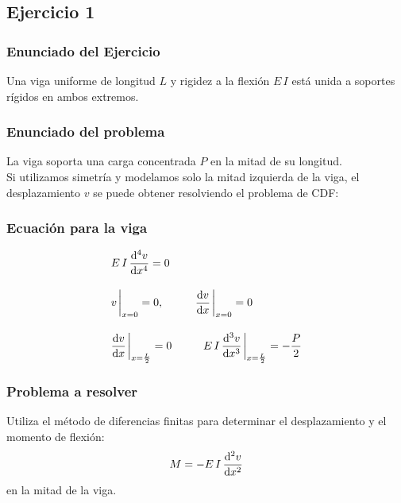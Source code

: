 \documentclass[12pt]{beamer}
\begin{document}
\subsection{Ejercicio 1}

\begin{frame}
\frametitle{Enunciado del Ejercicio}
Una viga uniforme de longitud $L$ y rigidez a la flexión $E \, I$ está unida a soportes rígidos en ambos extremos.
\\
\bigskip
\pause
\begin{figure}
\end{figure}
\end{frame}
\begin{frame}
\frametitle{Enunciado del problema}
La viga soporta una carga concentrada $P$ en la mitad de su longitud.
\\
\bigskip
\pause
Si utilizamos simetría y modelamos solo la mitad izquierda de la viga, el desplazamiento $v$ se puede obtener resolviendo el problema de CDF:
\end{frame}
\begin{frame}
\frametitle{Ecuación para la viga}
\begin{align*}
&E \, I \, \dv[4]{v}{x} = 0 \\[1em]
&v \eval_{x=0} = 0, \hspace{1cm} \dv{v}{x} \eval_{x=0} = 0 \\[1em]
&\dv{v}{x} \eval_{x=\frac{L}{2}} = 0 \hspace{1cm} E \, I \, \dv[3]{v}{x} \eval_{x=\frac{L}{2}} = -\dfrac{P}{2}
\end{align*}
\end{frame}
\begin{frame}
\frametitle{Problema a resolver}
Utiliza el método de diferencias finitas para determinar el desplazamiento y el momento de flexión:
\begin{align*}
M = - E \, I \, \dv[2]{v}{x}
\end{align*}
en la mitad de la viga.
\end{frame}
\end{document}
